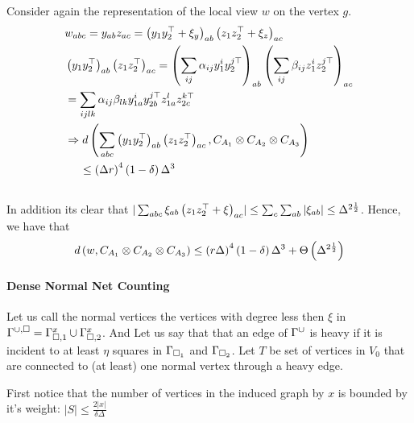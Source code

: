 \documentclass{article}
\begin{document}
\begin{multicols*}{2}
      Consider again the representation of the local view $w$ on the vertex $g$. 
      \begin{equation*}
	\begin{split}
	  & w_{abc} = y_{ab}z_{ac} = \left( y_{1}y_{2}^{\top} + \xi_{y} \right)_{ab}   \left( z_{1}z_{2}^{\top} + \xi_{z} \right)_{ac} \\ 
	  & \left( y_{1}y_{2}^{\top}\right)_{ab}\left(z_{1}z_{2}^{\top} \right)_{ac} = 
	  \left( \sum_{ij} { \alpha_{ij} y_{1}^{i}y_{2}^{j  \top}}  \right)_{ab}\left(   \sum_{ij} { \beta_{ij} z_{1}^{i}z_{2}^{j  \top}} \right)_{ac}\\ 
	  &= \sum_{ijlk} { \alpha_{ij}\beta_{lk} y_{1a}^{i}y_{2b}^{j \top}} z_{1a}^{l}z_{2c}^{k \top} \\
	  & \Rightarrow d\left( \sum_{abc} \left( y_{1}y_{2}^{\top}\right)_{ab}\left(z_{1}z_{2}^{\top} \right)_{ac} , C_{A_{1}} \otimes C_{A_{2}} \otimes C_{A_{3}} \right) \\ 
	  & \ \ \ \ \le \left( \Delta r \right)^{4} \left( 1-\delta \right)\Delta^{3} \\ & 
	\end{split}
      \end{equation*}
      In addition its clear that $ | \sum_{abc}{\xi_{ab}\left( z_{1}z_{2}^{\top} + \xi\right)_{ac}} | \le  \sum_{c}\sum_{ab}{|\xi_{ab}|} \le \Delta^{ 2\frac{1}{2}} $. Hence, we have that 
  \begin{equation*}
    \begin{split}
      d\left( w, C_{A_{1}} \otimes C_{A_{2}} \otimes C_{A_{3}}  \right) \le  \left( r\Delta \right)^{4}\left( 1 - \delta \right)\Delta^{3} + \Theta \left( \Delta^{2\frac{1}{2}}  \right)
    \end{split}
  \end{equation*}
  		\paragraph{Dense Normal Net Counting} Let us call the normal vertices the vertices with degree less then $\xi$ in $\Gamma^{\cup, \square} = \Gamma_{\square, 1}^{x} \cup \Gamma_{\square, 2}^{x}$. 
    And Let us say that that an edge of $\Gamma^{\cup}$ is heavy if it is incident to at least $\eta$ squares in $\Gamma_{\square_{1}}$ and $\Gamma_{\square_{2}}$. Let $ T$ be set of vertices in $V_0$ that are connected to (at least) one normal vertex through a heavy edge. 

    First notice that the number of vertices in the induced graph by $x$ is bounded by it's weight:
    $ |S| \le \frac{2|x|}{ \delta\Delta }$ 


\end{multicols*}
\end{document}
